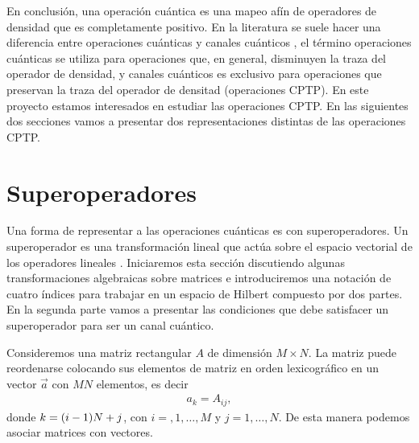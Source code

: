 
En conclusión, una operación cuántica es una mapeo afín de 
operadores de densidad que es completamente positivo. 
En la literatura se suele hacer una diferencia entre operaciones cuánticas
y canales cuánticos \cite{weedbrook2012gaussian}, el término operaciones 
cuánticas se utiliza para operaciones que, en general, disminuyen la traza 
del operador de densidad, y canales cuánticos es exclusivo para operaciones 
que preservan la traza del operador de densitad (operaciones CPTP). En 
este proyecto estamos interesados en estudiar las operaciones CPTP. 
En las siguientes dos secciones vamos a presentar dos representaciones
distintas de las operaciones CPTP. 



\section{Superoperadores}

Una forma de representar a las operaciones cuánticas es con 
superoperadores. Un superoperador es una transformación lineal
que actúa sobre el espacio vectorial de los operadores lineales 
\cite{preskill1998lecture}. Iniciaremos esta sección discutiendo algunas
transformaciones algebraicas sobre matrices e introduciremos 
una notación de cuatro índices para trabajar en un espacio de Hilbert 
compuesto por dos partes. En la segunda parte vamos a presentar 
las condiciones que debe satisfacer un superoperador para ser un 
canal cuántico. 

Consideremos una matriz rectangular $A$ de dimensión $M\times N$.
La matriz puede reordenarse colocando sus elementos de matriz en 
orden lexicográfico en un vector $\vec{a}$ con $MN$ elementos, es decir
\begin{align}
a_k=A_{ij}, 
\end{align}
donde $k=\qty(i-1)N+j$, con $i=,1,\ldots,M$ y $j=1,\ldots,N$. De
esta manera podemos asociar matrices con vectores. 

